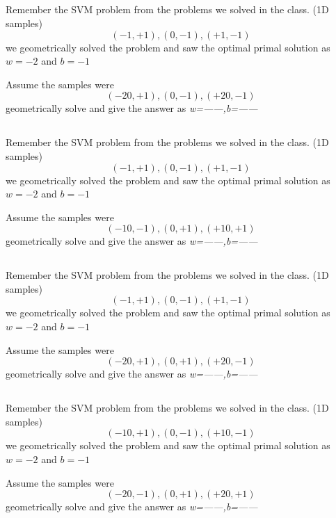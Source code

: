 \begin{frame}
\section{}
Remember the SVM problem from the problems we solved in the class. (1D samples)
\[ (-1,+1), (0,-1), (+1,-1) \]
we geometrically solved the problem and saw the optimal primal solution as $w=-2$ and $b=-1$

Assume the samples were
\[ (-20,+1), (0,-1), (+20,-1) \]
geometrically solve and give the answer as \textit{w=------,b=------}

\end{frame}

\begin{frame}
\section{}
Remember the SVM problem from the problems we solved in the class. (1D samples)
\[ (-1,+1), (0,-1), (+1,-1) \]
we geometrically solved the problem and saw the optimal primal solution as $w=-2$ and $b=-1$

Assume the samples were
\[ (-10,-1), (0,+1), (+10,+1) \]
geometrically solve and give the answer as \textit{w=------,b=------}

\end{frame}

\begin{frame}
\section{}
Remember the SVM problem from the problems we solved in the class. (1D samples)
\[ (-1,+1), (0,-1), (+1,-1) \]
we geometrically solved the problem and saw the optimal primal solution as $w=-2$ and $b=-1$

Assume the samples were
\[ (-20,+1), (0,+1), (+20,-1) \]
geometrically solve and give the answer as \textit{w=------,b=------}

\end{frame}

\begin{frame}
\section{}
Remember the SVM problem from the problems we solved in the class. (1D samples)
\[ (-10,+1), (0,-1), (+10,-1) \]
we geometrically solved the problem and saw the optimal primal solution as $w=-2$ and $b=-1$

Assume the samples were
\[ (-20,-1), (0,+1), (+20,+1) \]
geometrically solve and give the answer as \textit{w=------,b=------}

\end{frame}


